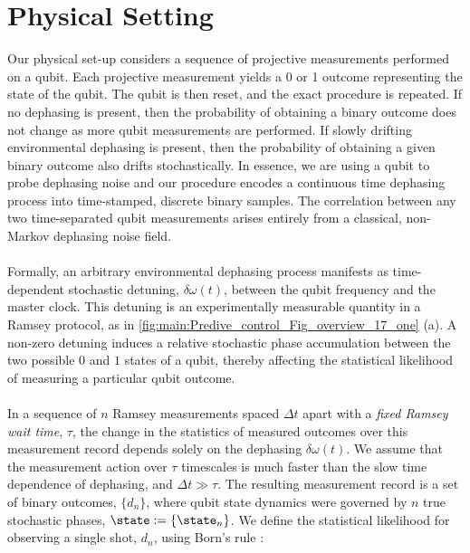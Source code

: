 \section{Physical Setting \label{sec:main:PhysicalSetting}}  
\label{sec:main:1} 

Our physical set-up considers a sequence of projective measurements performed on a qubit. Each projective measurement yields a 0 or 1 outcome representing the state of the qubit. The qubit is then reset, and the exact procedure is repeated. If no dephasing is present, then the probability of obtaining a binary outcome does not change as more qubit measurements are performed. If slowly drifting environmental dephasing is present, then the probability of obtaining a given binary outcome also drifts stochastically. In essence, we are using a qubit to probe dephasing noise and our procedure encodes a continuous time dephasing process into time-stamped, discrete binary samples.  The correlation between any two time-separated qubit measurements arises entirely from a classical, non-Markov dephasing noise field. 
\\
\\
Formally, an arbitrary environmental dephasing process manifests as time-dependent stochastic detuning, $\delta \omega (t)$, between the qubit frequency and the master clock. This detuning is an experimentally measurable quantity in a Ramsey protocol, as in \cref{fig:main:Predive_control_Fig_overview_17_one} (a). A non-zero detuning induces a relative stochastic phase accumulation between the two possible $0$ and $1$ states of a qubit, thereby affecting the statistical likelihood of measuring a particular qubit outcome. 
\\
\\
In a sequence of $n$ Ramsey measurements spaced $\Delta t$ apart with a \textit{fixed Ramsey wait time}, $\tau$, the change in the statistics of measured outcomes over this measurement record depends solely on the dephasing  $\delta \omega(t)$.   We assume that the measurement action over $\tau$ timescales is much faster than the slow time dependence of dephasing, and $\Delta t \gg \tau$. The resulting measurement record is a set of binary outcomes,  $\{d_n\}$,  where qubit state dynamics were governed by $n$ true stochastic phases, $\state := \{\state_n\}$. We define the statistical likelihood for observing a single shot, $d_n$, using Born's rule \cite{ferrie2013}:

